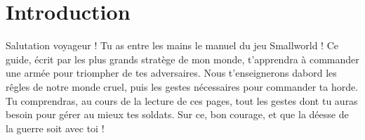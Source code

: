 ﻿\section{Introduction}
	Salutation voyageur ! \newline
	Tu as entre les mains le manuel du jeu Smallworld ! Ce guide, écrit par les plus grands stratège de mon monde, t'apprendra à commander une armée pour triompher de tes adversaires.
	Nous t'enseignerons dabord les rêgles de notre monde cruel, puis les gestes nécessaires pour commander ta horde.
	Tu comprendras, au cours de la lecture de ces pages, tout les gestes dont tu auras besoin pour gérer au mieux tes soldats.
	Sur ce, bon courage, et que la déesse de la guerre soit avec toi !
	
